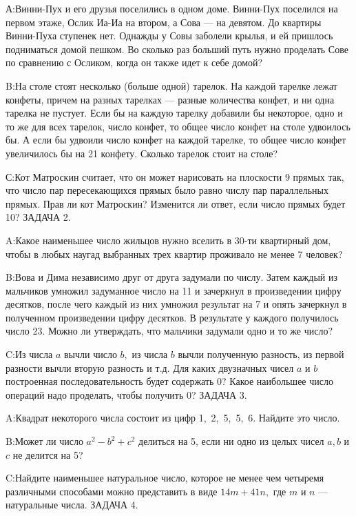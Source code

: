 \documentclass[10pt]{scrbook} \usepackage{modules/nonstahp_book}
\begin{document}
А:\qquad Винни-Пух и его друзья поселились в одном доме. Винни-Пух поселился на первом этаже, Ослик Иа-Иа на втором, а Сова — на девятом. До квартиры Винни-Пуха ступенек нет. Однажды у Совы заболели крылья, и ей пришлось подниматься домой пешком. Во сколько раз больший путь нужно проделать Сове по сравнению с Осликом, когда он также идет к себе домой?

B:\qquad На столе стоят несколько (больше одной) тарелок. На каждой тарелке лежат конфеты, причем на разных тарелках — разные количества конфет, и ни одна тарелка не пустует. Если бы на каждую тарелку добавили бы некоторое, одно и то же для всех тарелок, число конфет, то общее число конфет на столе удвоилось бы. А если бы удвоили число конфет на каждой тарелке, то общее число конфет увеличилось бы на 21 конфету. Сколько тарелок стоит на столе?

С:\qquad Кот Матроскин считает, что он может нарисовать на плоскости 9 прямых так, что число пар пересекающихся прямых было равно числу пар параллельных прямых. Прав ли кот Матроскин? Изменится ли ответ, если число прямых будет 10?
\medbreak
\noindent
ЗАДАЧА 2.

A:\qquad Какое наименьшее число жильцов нужно вселить в 30-ти квартирный дом, чтобы в любых наугад выбранных трех квартир проживало не менее 7 человек?

 B:\qquad Вова и Дима независимо друг от друга задумали по числу. Затем каждый из мальчиков умножил задуманное число на 11 и зачеркнул в произведении цифру десятков, после чего каждый из них умножил результат на 7 и опять зачеркнул в полученном произведении цифру десятков. В результате у каждого получилось число 23. Можно ли утверждать, что мальчики задумали одно и то же число?

 C:\qquad Из числа $a$ вычли число $b,$ из числа $b$ вычли полученную разность, из первой разности вычли вторую разность и т.д. Для каких двузначных чисел $a$ и $b$ построенная последовательность будет содержать 0? Какое наибольшее число операций надо проделать, чтобы получить 0?
\medbreak
\noindent
ЗАДАЧА 3.

A:\qquad Квадрат некоторого числа состоит из цифр 1,\ 2,\ 5,\ 5,\ 6. Найдите это число.

B:\qquad  Может ли число $a^2-b^2+c^2$ делиться на 5, если ни одно из целых чисел $a,b$ и $c$ не делится на 5?

C:\qquad Найдите наименьшее натуральное число, которое не менее чем четыремя различными способами можно представить в виде $14m+41n,$ где $m$ и $n$ — натуральные числа.
\medbreak
\noindent
ЗАДАЧА 4.
\end{document}
